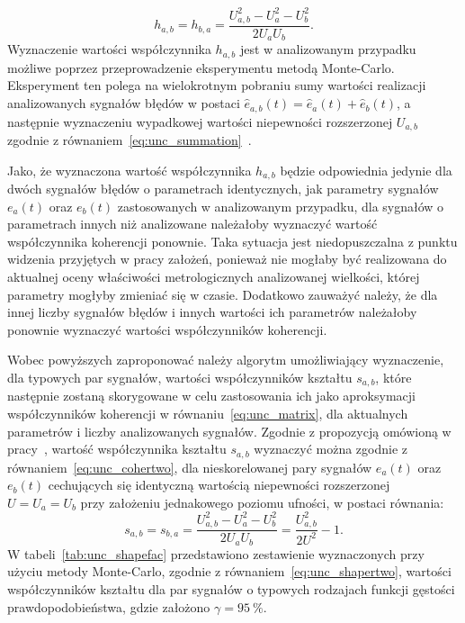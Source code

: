 \begin{equation}
h_{a,b} = h_{b,a} = \frac{U_{a,b}^{2} - U_{a}^{2} - U_{b}^{2}}{2 U_{a} U_{b}} \label{eq:unc_cohertwo}.
\end{equation}
Wyznaczenie wartości współczynnika $h_{a,b}$ jest w analizowanym przypadku możliwe poprzez przeprowadzenie eksperymentu metodą Monte-Carlo. Eksperyment ten polega na wielokrotnym pobraniu sumy wartości realizacji analizowanych sygnałów błędów w postaci $\hat{e}_{a,b}(t) = \hat{e}_{a}(t) + \hat{e}_{b}(t)$, a następnie wyznaczeniu wypadkowej wartości niepewności rozszerzonej $U_{a,b}$ zgodnie z równaniem~\eqref{eq:unc_summation}~\cite{jcgm_montecarlo, jcgm_guide}.

Jako, że wyznaczona wartość współczynnika $h_{a,b}$ będzie odpowiednia jedynie dla dwóch sygnałów błędów o parametrach identycznych, jak parametry sygnałów $e_{a}(t)$ oraz $e_{b}(t)$ zastosowanych w analizowanym przypadku, dla sygnałów o parametrach innych niż analizowane należałoby wyznaczyć wartość współczynnika koherencji ponownie. Taka sytuacja jest niedopuszczalna z punktu widzenia przyjętych w pracy założeń, ponieważ nie mogłaby być realizowana do aktualnej oceny właściwości metrologicznych analizowanej wielkości, której parametry mogłyby zmieniać się w czasie. Dodatkowo zauważyć należy, że dla innej liczby sygnałów błędów i innych wartości ich parametrów należałoby ponownie wyznaczyć wartości współczynników koherencji.

Wobec powyższych zaproponować należy algorytm umożliwiający wyznaczenie, dla typowych par sygnałów, wartości współczynników kształtu $s_{a,b}$, które następnie zostaną skorygowane w celu zastosowania ich jako aproksymacji współczynników koherencji w równaniu~\eqref{eq:unc_matrix}, dla aktualnych parametrów i liczby analizowanych sygnałów. Zgodnie z propozycją omówioną w pracy~\cite{jakubiec_model}, wartość współczynnika kształtu $s_{a,b}$ wyznaczyć można zgodnie z równaniem~\eqref{eq:unc_cohertwo}, dla nieskorelowanej pary sygnałów $e_{a}(t)$ oraz $e_{b}(t)$ cechujących się identyczną wartością niepewności rozszerzonej $U = U_{a} = U_{b}$ przy założeniu jednakowego poziomu ufności, w postaci równania:
\begin{equation}
s_{a,b} = s_{b,a} = \frac{U_{a,b}^{2} - U_{a}^{2} - U_{b}^{2}}{2 U_{a} U_{b}} = \frac{U_{a,b}^{2}}{2 U^{2}} - 1 \label{eq:unc_shapertwo}.
\end{equation}
W tabeli~\ref{tab:unc_shapefac} przedstawiono zestawienie wyznaczonych przy użyciu metody Monte-Carlo, zgodnie z równaniem~\eqref{eq:unc_shapertwo}, wartości współczynników kształtu dla par sygnałów o typowych rodzajach funkcji gęstości prawdopodobieństwa, gdzie założono $\gamma = \qty{95}{\percent}$.

